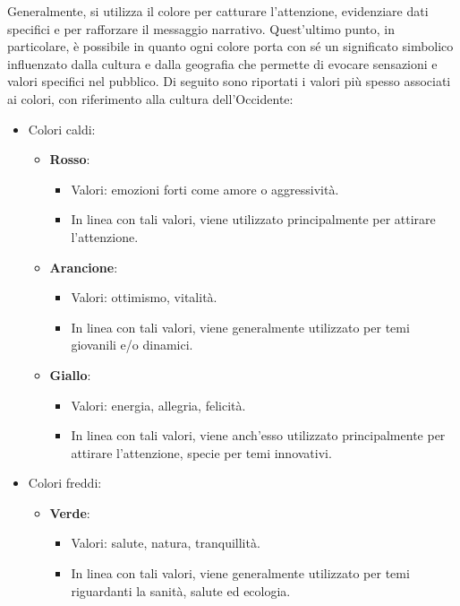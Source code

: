 Generalmente, si utilizza il colore per catturare l'attenzione, evidenziare dati specifici e per rafforzare il messaggio narrativo. Quest'ultimo punto, in particolare, è possibile in quanto ogni colore porta con sé un 
significato simbolico influenzato dalla cultura e dalla geografia che permette di evocare sensazioni e valori specifici nel pubblico.
Di seguito sono riportati i valori più spesso associati ai colori, con riferimento alla cultura dell'Occidente:
\begin{itemize}
    \item Colori caldi:
    \begin{itemize}
        \item \textbf{Rosso}:
        \begin{itemize}
            \item Valori: emozioni forti come amore o aggressività.
            \item In linea con tali valori, viene utilizzato principalmente per attirare l'attenzione.
        \end{itemize}
        \item \textbf{Arancione}:
        \begin{itemize}
            \item Valori: ottimismo, vitalità.
            \item In linea con tali valori, viene generalmente utilizzato per temi giovanili e/o dinamici.
        \end{itemize}
        \item \textbf{Giallo}:
        \begin{itemize}
            \item Valori: energia, allegria, felicità.
            \item In linea con tali valori, viene anch'esso utilizzato principalmente per attirare l'attenzione, specie per temi innovativi.
        \end{itemize}
    \end{itemize}
    \item Colori freddi:
    \begin{itemize}
        \item \textbf{Verde}:
        \begin{itemize}
            \item Valori: salute, natura, tranquillità.
            \item In linea con tali valori, viene generalmente utilizzato per temi riguardanti la sanità, salute ed ecologia.
        \end{itemize}

\end{itemize}
\end{itemize}
